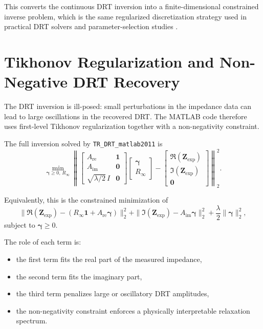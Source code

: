 \documentclass[11pt]{article}
\begin{document}
This converts the continuous DRT inversion into a finite-dimensional constrained inverse problem, which is the same regularized discretization strategy used in practical DRT solvers and parameter-selection studies \cite{saccoccio2014,schluter2019,maradesa2023}.

\section{Tikhonov Regularization and Non-Negative DRT Recovery}

The DRT inversion is ill-posed: small perturbations in the impedance data can lead to large oscillations in the recovered DRT. The MATLAB code therefore uses first-level Tikhonov regularization together with a non-negativity constraint.

The full inversion solved by \texttt{TR\_DRT\_matlab2011} is
\begin{equation}
\min_{\bm{\gamma} \ge 0,\, R_{\infty}} 
\left\|
\begin{bmatrix}
A_{\mathrm{re}} & \bm{1} \\
A_{\mathrm{im}} & \bm{0} \\
\sqrt{\lambda/2}\,I & \bm{0}
\end{bmatrix}
\begin{bmatrix}
\bm{\gamma} \\
R_{\infty}
\end{bmatrix}
-
\begin{bmatrix}
\Re(\bm{Z}_{\mathrm{exp}}) \\
\Im(\bm{Z}_{\mathrm{exp}}) \\
\bm{0}
\end{bmatrix}
\right\|_2^2.
\end{equation}

Equivalently, this is the constrained minimization of
\begin{equation}
\|\Re(\bm{Z}_{\mathrm{exp}}) - (R_{\infty}\bm{1} + A_{\mathrm{re}}\bm{\gamma})\|_2^2
+ \|\Im(\bm{Z}_{\mathrm{exp}}) - A_{\mathrm{im}}\bm{\gamma}\|_2^2
+ \frac{\lambda}{2}\|\bm{\gamma}\|_2^2,
\end{equation}
subject to $\bm{\gamma} \ge 0$.

The role of each term is:

\begin{itemize}
\item the first term fits the real part of the measured impedance,
\item the second term fits the imaginary part,
\item the third term penalizes large or oscillatory DRT amplitudes,
\item the non-negativity constraint enforces a physically interpretable relaxation spectrum.
\end{itemize}
\end{document}
